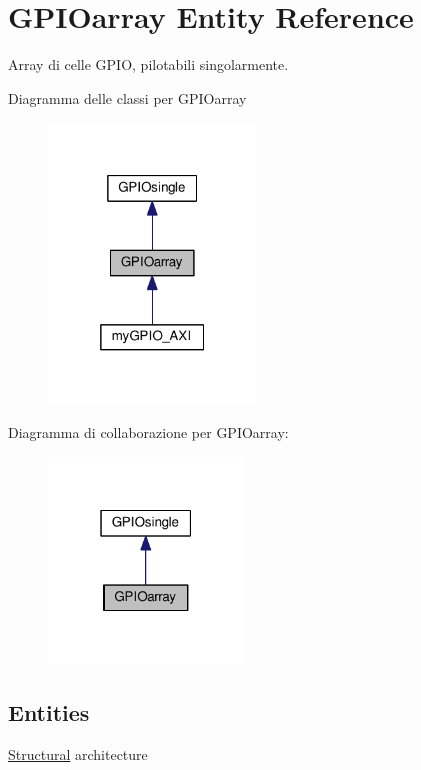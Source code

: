 \hypertarget{class_g_p_i_oarray}{\section{G\+P\+I\+Oarray Entity Reference}
\label{class_g_p_i_oarray}
}


Array di celle G\+P\+I\+O, pilotabili singolarmente.  




Diagramma delle classi per G\+P\+I\+Oarray\nopagebreak
\begin{figure}[H]
\begin{center}
\leavevmode
\includegraphics[width=157pt]{class_g_p_i_oarray__inherit__graph}
\end{center}
\end{figure}


Diagramma di collaborazione per G\+P\+I\+Oarray\+:\nopagebreak
\begin{figure}[H]
\begin{center}
\leavevmode
\includegraphics[width=147pt]{class_g_p_i_oarray__coll__graph}
\end{center}
\end{figure}
\subsection*{Entities}
\begin{DoxyCompactItemize}
\item 
\hyperlink{class_g_p_i_oarray_1_1_structural}{Structural} architecture
\end{DoxyCompactItemize}
